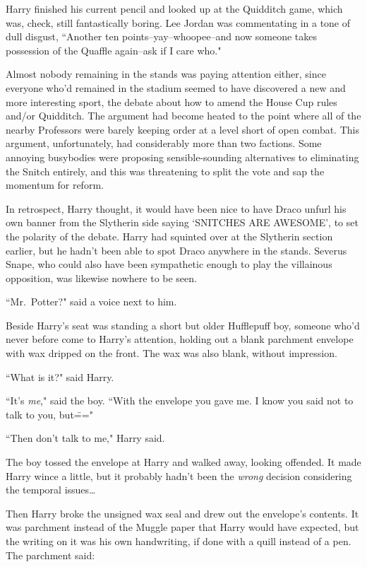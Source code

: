 Harry finished his current pencil and looked up at the Quidditch game, which was, check, still fantastically boring. Lee Jordan was commentating in a tone of dull disgust, ``Another ten points\---yay\---whoopee\---and now someone takes possession of the Quaffle again\---ask if I care who."

Almost nobody remaining in the stands was paying attention either, since everyone who'd remained in the stadium seemed to have discovered a new and more interesting sport, the debate about how to amend the House Cup rules and/or Quidditch. The argument had become heated to the point where all of the nearby Professors were barely keeping order at a level short of open combat. This argument, unfortunately, had considerably more than two factions. Some annoying busybodies were proposing sensible-sounding alternatives to eliminating the Snitch entirely, and this was threatening to split the vote and sap the momentum for reform.

In retrospect, Harry thought, it would have been nice to have Draco unfurl his own banner from the Slytherin side saying `SNITCHES ARE AWESOME', to set the polarity of the debate. Harry had squinted over at the Slytherin section earlier, but he hadn't been able to spot Draco anywhere in the stands. Severus Snape, who could also have been sympathetic enough to play the villainous opposition, was likewise nowhere to be seen.

``Mr.~Potter?" said a voice next to him.

Beside Harry's seat was standing a short but older Hufflepuff boy, someone who'd never before come to Harry's attention, holding out a blank parchment envelope with wax dripped on the front. The wax was also blank, without impression.

``What is it?" said Harry.

``It's \emph{me}," said the boy. ``With the envelope you gave me. I know you said not to talk to you, but\==="

``Then don't talk to me," Harry said.

The boy tossed the envelope at Harry and walked away, looking offended. It made Harry wince a little, but it probably hadn't been the \emph{wrong} decision considering the temporal issues{\ldots}

Then Harry broke the unsigned wax seal and drew out the envelope's contents. It was parchment instead of the Muggle paper that Harry would have expected, but the writing on it was his own handwriting, if done with a quill instead of a pen. The parchment said:

